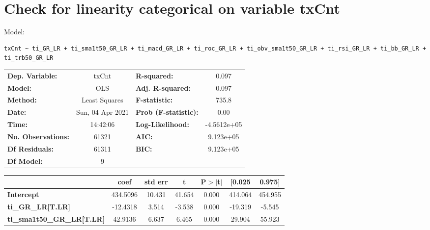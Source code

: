 \section{Check for linearity categorical on variable txCnt}

Model: \begin{verbatim}txCnt ~ ti_GR_LR + ti_sma1t50_GR_LR + ti_macd_GR_LR + ti_roc_GR_LR + ti_obv_sma1t50_GR_LR + ti_rsi_GR_LR + ti_bb_GR_LR + ti_trb50_GR_LR\end{verbatim}

\begin{center}
\begin{tabular}{lclc}
\toprule
\textbf{Dep. Variable:}                 &      txCnt       & \textbf{  R-squared:         } &      0.097   \\
\textbf{Model:}                         &       OLS        & \textbf{  Adj. R-squared:    } &      0.097   \\
\textbf{Method:}                        &  Least Squares   & \textbf{  F-statistic:       } &      735.8   \\
\textbf{Date:}                          & Sun, 04 Apr 2021 & \textbf{  Prob (F-statistic):} &      0.00    \\
\textbf{Time:}                          &     14:42:06     & \textbf{  Log-Likelihood:    } & -4.5612e+05  \\
\textbf{No. Observations:}              &       61321      & \textbf{  AIC:               } &  9.123e+05   \\
\textbf{Df Residuals:}                  &       61311      & \textbf{  BIC:               } &  9.123e+05   \\
\textbf{Df Model:}                      &           9      & \textbf{                     } &              \\
\bottomrule
\end{tabular}
\begin{tabular}{lcccccc}
                                        & \textbf{coef} & \textbf{std err} & \textbf{t} & \textbf{P$> |$t$|$} & \textbf{[0.025} & \textbf{0.975]}  \\
\midrule
\textbf{Intercept}                      &     434.5096  &       10.431     &    41.654  &         0.000        &      414.064    &      454.955     \\
\textbf{ti\_GR\_LR[T.LR]}               &     -12.4318  &        3.514     &    -3.538  &         0.000        &      -19.319    &       -5.545     \\
\textbf{ti\_sma1t50\_GR\_LR[T.LR]}      &      42.9136  &        6.637     &     6.465  &         0.000        &       29.904    &       55.923     \\

\end{tabular}
\end{center}
